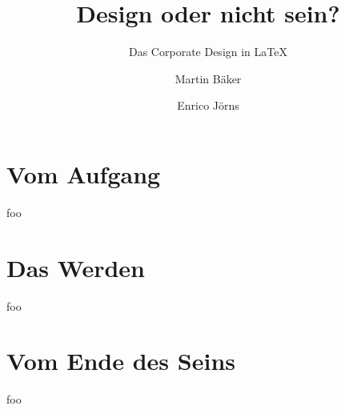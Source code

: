 \documentclass{beamer}
\begin{document}
\title{Design oder nicht sein?}
\subtitle{Das Corporate Design in  LaTeX}
\author{Martin Bäker\and Enrico Jörns}
\titlegraphic{\tuDefaultTitlegraphic}

\begin{frame}[plain]
  \titlepage
\end{frame}


\part{Vom Aufgang}

\begin{frame}[plain]
  \partpage
\end{frame}

\begin{frame}
  foo
\end{frame}

\part{Das Werden}

\begin{frame}
  \partpage
\end{frame}


\begin{frame}
  foo
\end{frame}

\part{Vom Ende des Seins}



\begin{frame}
  foo
\end{frame}



\begin{frame}[plain]
  \partpage
\end{frame}
\end{document}
